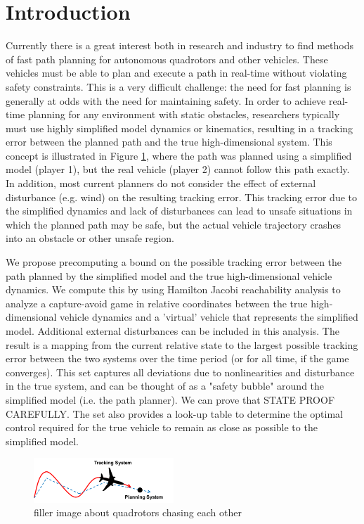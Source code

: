 \section{Introduction}
 Currently there is a great interest both in research and industry to find methods of fast path planning for autonomous quadrotors and other vehicles. These vehicles must be able to plan and execute a path in real-time without violating safety constraints. This is a very difficult challenge: the need for fast planning is generally at odds with the need for maintaining safety. In order to achieve real-time planning for any environment with static obstacles, researchers typically must use highly simplified model dynamics or kinematics, resulting in a tracking error between the planned path and the true high-dimensional system. This concept is illustrated in Figure \ref{fig:chasing}, where the path was planned using a simplified model (player 1), but the real vehicle (player 2) cannot follow this path exactly. In addition, most current planners do not consider the effect of external disturbance (e.g. wind) on the resulting tracking error. This tracking error due to the simplified dynamics and lack of disturbances can lead to unsafe situations in which the planned path may be safe, but the actual vehicle trajectory crashes into an obstacle or other unsafe region.

We propose precomputing a bound on the possible tracking error between the path planned by the simplified model and the true high-dimensional vehicle dynamics. We compute this by using Hamilton Jacobi reachability analysis to analyze a capture-avoid game in relative coordinates between the true high-dimensional vehicle dynamics and a 'virtual' vehicle that represents the simplified model. Additional external disturbances can be included in this analysis. The result is a mapping from the current relative state to the largest possible tracking error between the two systems over the time period (or for all time, if the game converges). This set captures all deviations due to nonlinearities and disturbance in the true system, and can be thought of as a "safety bubble" around the simplified model (i.e. the path planner). We can prove that STATE PROOF CAREFULLY. The set also provides a look-up table to determine the optimal control required for the true vehicle to remain as close as possible to the simplified model.

\begin{figure}
	\centering
	\includegraphics[width=0.47\textwidth]{fig/chasing}
	\caption{filler image about quadrotors chasing each other}
	\label{fig:chasing}
\end{figure}

